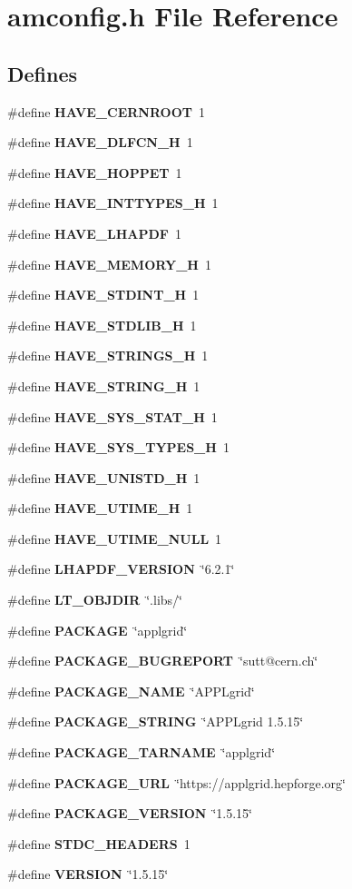 \section{amconfig.h File Reference}
\label{amconfig_8h}
\subsection*{Defines}
\begin{DoxyCompactItemize}
\item 
\#define {\bf HAVE\_\-CERNROOT}~1
\item 
\#define {\bf HAVE\_\-DLFCN\_\-H}~1
\item 
\#define {\bf HAVE\_\-HOPPET}~1
\item 
\#define {\bf HAVE\_\-INTTYPES\_\-H}~1
\item 
\#define {\bf HAVE\_\-LHAPDF}~1
\item 
\#define {\bf HAVE\_\-MEMORY\_\-H}~1
\item 
\#define {\bf HAVE\_\-STDINT\_\-H}~1
\item 
\#define {\bf HAVE\_\-STDLIB\_\-H}~1
\item 
\#define {\bf HAVE\_\-STRINGS\_\-H}~1
\item 
\#define {\bf HAVE\_\-STRING\_\-H}~1
\item 
\#define {\bf HAVE\_\-SYS\_\-STAT\_\-H}~1
\item 
\#define {\bf HAVE\_\-SYS\_\-TYPES\_\-H}~1
\item 
\#define {\bf HAVE\_\-UNISTD\_\-H}~1
\item 
\#define {\bf HAVE\_\-UTIME\_\-H}~1
\item 
\#define {\bf HAVE\_\-UTIME\_\-NULL}~1
\item 
\#define {\bf LHAPDF\_\-VERSION}~\char`\"{}6.2.1\char`\"{}
\item 
\#define {\bf LT\_\-OBJDIR}~\char`\"{}.libs/\char`\"{}
\item 
\#define {\bf PACKAGE}~\char`\"{}applgrid\char`\"{}
\item 
\#define {\bf PACKAGE\_\-BUGREPORT}~\char`\"{}sutt@cern.ch\char`\"{}
\item 
\#define {\bf PACKAGE\_\-NAME}~\char`\"{}APPLgrid\char`\"{}
\item 
\#define {\bf PACKAGE\_\-STRING}~\char`\"{}APPLgrid 1.5.15\char`\"{}
\item 
\#define {\bf PACKAGE\_\-TARNAME}~\char`\"{}applgrid\char`\"{}
\item 
\#define {\bf PACKAGE\_\-URL}~\char`\"{}https://applgrid.hepforge.org\char`\"{}
\item 
\#define {\bf PACKAGE\_\-VERSION}~\char`\"{}1.5.15\char`\"{}
\item 
\#define {\bf STDC\_\-HEADERS}~1
\item 
\#define {\bf VERSION}~\char`\"{}1.5.15\char`\"{}
\end{DoxyCompactItemize}


